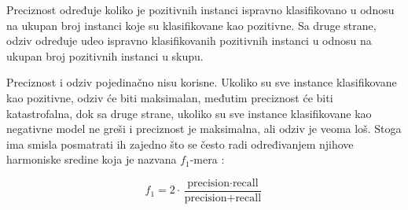 \noindent Preciznost određuje koliko je pozitivnih instanci ispravno klasifikovano u odnosu na ukupan broj instanci koje su klasifikovane kao pozitivne. Sa druge strane, odziv određuje udeo ispravno klasifikovanih pozitivnih instanci u odnosu na ukupan broj pozitivnih instanci u skupu. 

Preciznost i odziv pojedinačno nisu korisne. Ukoliko su sve instance klasifikovane kao pozitivne, odziv će biti maksimalan, međutim preciznost će biti katastrofalna, dok sa druge strane, ukoliko su sve instance klasifikovane kao negativne model ne greši i preciznost je maksimalna, ali odziv je veoma loš. Stoga ima smisla posmatrati ih zajedno što se često radi određivanjem njihove harmoniske sredine koja je nazvana $f_1$-mera \cite{ml}:

$$f_1 = 2 \cdot \dfrac{\text{precision} \cdot \text{recall}}{\text{precision} + \text{recall}}$$


